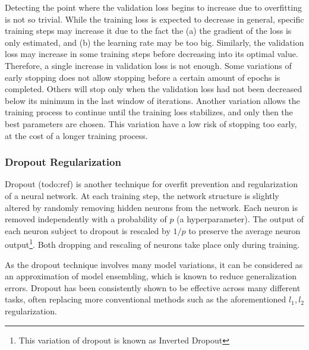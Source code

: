 Detecting the point where the validation loss begins to increase due to overfitting is not so trivial. While the training loss is expected to decrease in general, specific training steps may increase it due to the fact the (a) the gradient of the loss is only estimated, and (b) the learning rate may be too big. Similarly, the validation loss may increase in some training steps before decreasing into its optimal value. Therefore, a single increase in validation loss is not enough. Some variations of early stopping does not allow stopping before a certain amount of epochs is completed. Others will stop only when the validation loss had not been decreased below its minimum in the last window of iterations. Another variation allows the training process to continue until the training loss stabilizes, and only then the best parameters are chosen. This variation have a low risk of stopping too early, at the cost of a longer training process.

\subsubsection{Dropout Regularization}

Dropout (todo:ref) is another technique for overfit prevention and regularization of a neural network. At each training step, the network structure is slightly altered by randomly removing hidden neurons from the network. Each neuron is removed independently with a probability of $p$ (a hyperparameter). The output of each neuron subject to dropout is rescaled by $1/p$ to preserve the average neuron output\footnote{This variation of dropout is known as Inverted Dropout}. Both dropping and rescaling of neurons take place only during training. 

As the dropout technique involves many model variations, it can be considered as an approximation of model ensembling, which is known to reduce generalization errors. Dropout has been consistently shown to be effective across many different tasks, often replacing more conventional methods such as the aforementioned $l_1,l_2$ regularization.

 
